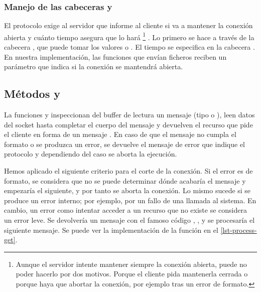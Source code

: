 \subsubsection{Manejo de las cabeceras  y }
El protocolo {\HTTP} exige al servidor que informe al cliente si va a mantener la conexión abierta y cuánto tiempo asegura que lo hará%
\footnote{Aunque el servidor intente mantener siempre la conexión abierta, puede no poder hacerlo por dos motivos. Porque el cliente pida mantenerla cerrada o porque haya que abortar la conexión, por ejemplo tras un error de formato.}
. Lo primero se hace a través de la cabecera , que puede tomar los valores  o . El tiempo se especifica en la cabecera . En nuestra implementación, las funciones que envían ficheros reciben un parámetro que indica si la conexión se mantendrá abierta.

\subsection{Métodos {\GET} y {\POST}}
La funciones  y  inspeccionan del buffer de lectura un mensaje (tipo {\GET} o {\POST}), leen datos del socket hasta completar el cuerpo del mensaje y devuelven el recurso que pide el cliente en forma de un mensaje . En caso de que el mensaje no cumpla el formato o se produzca un error, se devuelve el mensaje de error que indique el protocolo y dependiendo del caso se aborta la ejecución.

Hemos aplicado el siguiente criterio para el corte de la conexión. Si el error es de formato, se considera que no se puede determinar dónde acabaría el mensaje y empezaría el siguiente, y por tanto se aborta la conexión. Lo mismo sucede si se produce un error interno; por ejemplo, por un fallo de una llamada al sistema. En cambio, un error como intentar acceder a un recurso que no existe se considera un error leve. Se devolvería un mensaje con el famoso código {\HTTP}, , y se procesaría el siguiente mensaje. Se puede ver la implementación de la función  en el \cref{lst-process-get}.



